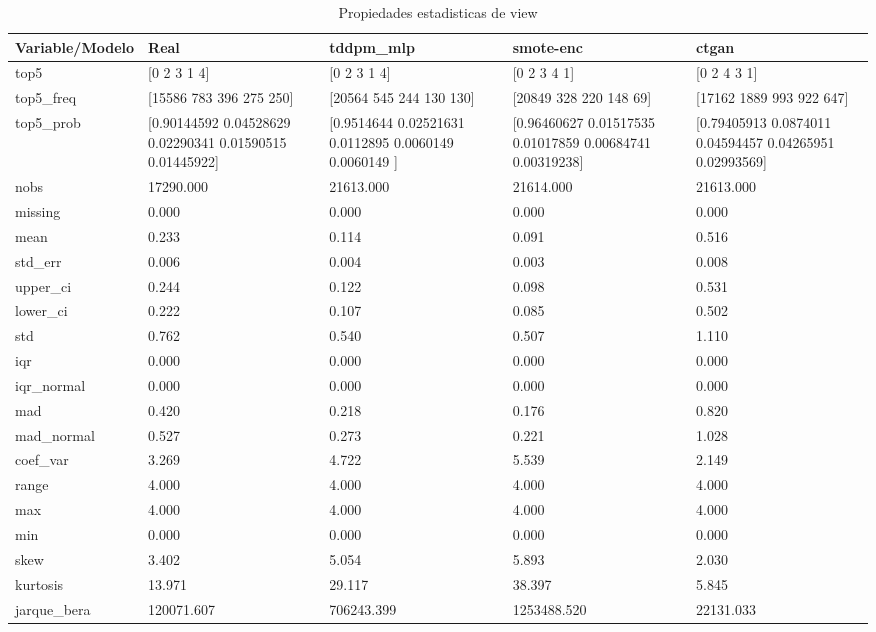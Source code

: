 \begin{table}[H]
\centering
\caption{Propiedades  estadisticas de view}
\label{table-stats-view}
\begin{tabular}{|l|m{10em}|m{10em}|m{10em}|m{10em}|}
\hline
 \rowcolor[gray]{0.8}
Variable/Modelo & Real & tddpm\_mlp & smote-enc & ctgan \\
\hline top5 & [0 2 3 1 4] & [0 2 3 1 4] & [0 2 3 4 1] & [0 2 4 3 1] \\
\hline top5\_freq & [15586   783   396   275   250] & [20564   545   244   130   130] & [20849   328   220   148    69] & [17162  1889   993   922   647] \\
\hline top5\_prob & [0.90144592 0.04528629 0.02290341 0.01590515 0.01445922] & [0.9514644  0.02521631 0.0112895  0.0060149  0.0060149 ] & [0.96460627 0.01517535 0.01017859 0.00684741 0.00319238] & [0.79405913 0.0874011  0.04594457 0.04265951 0.02993569] \\
\hline nobs & 17290.000 & 21613.000 & 21614.000 & 21613.000 \\
\hline missing & 0.000 & 0.000 & 0.000 & 0.000 \\
\hline mean & 0.233 & 0.114 & 0.091 & 0.516 \\
\hline std\_err & 0.006 & 0.004 & 0.003 & 0.008 \\
\hline upper\_ci & 0.244 & 0.122 & 0.098 & 0.531 \\
\hline lower\_ci & 0.222 & 0.107 & 0.085 & 0.502 \\
\hline std & 0.762 & 0.540 & 0.507 & 1.110 \\
\hline iqr & 0.000 & 0.000 & 0.000 & 0.000 \\
\hline iqr\_normal & 0.000 & 0.000 & 0.000 & 0.000 \\
\hline mad & 0.420 & 0.218 & 0.176 & 0.820 \\
\hline mad\_normal & 0.527 & 0.273 & 0.221 & 1.028 \\
\hline coef\_var & 3.269 & 4.722 & 5.539 & 2.149 \\
\hline range & 4.000 & 4.000 & 4.000 & 4.000 \\
\hline max & 4.000 & 4.000 & 4.000 & 4.000 \\
\hline min & 0.000 & 0.000 & 0.000 & 0.000 \\
\hline skew & 3.402 & 5.054 & 5.893 & 2.030 \\
\hline kurtosis & 13.971 & 29.117 & 38.397 & 5.845 \\
\hline jarque\_bera & 120071.607 & 706243.399 & 1253488.520 & 22131.033 \\

\end{tabular}
\end{table}
